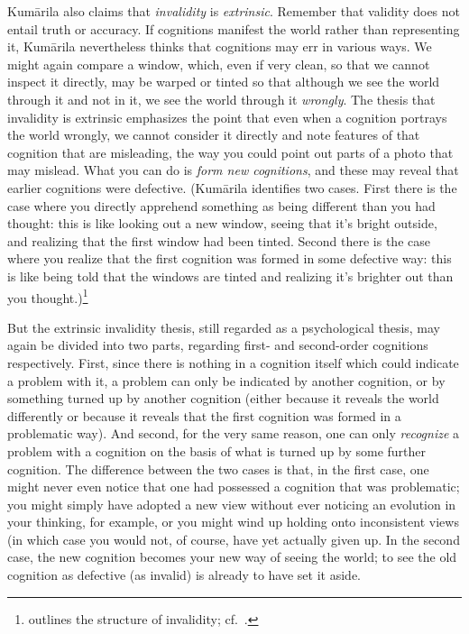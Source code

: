 ﻿\documentclass[11pt]{amsart}
\begin{document}
Kum\=arila also claims that \emph{invalidity} is \emph{extrinsic}. Remember that validity does not entail truth or accuracy. If cognitions manifest the world rather than representing it, Kum\=arila nevertheless thinks that cognitions may err in various ways. We might again compare a window, which, even if very clean, so that we cannot inspect it directly, may be warped or tinted so that although we see the world through it and not in it, we see the world through it \emph{wrongly}. The thesis that invalidity is extrinsic emphasizes the point that even when a cognition portrays the world wrongly, we cannot consider it directly and note features of that cognition that are misleading, the way you could point out parts of a photo that may mislead. What you can do is \emph{form new cognitions}, and these may reveal that earlier cognitions were defective. (Kum\=arila identifies two cases. First there is the case where you directly apprehend something as being different than you had thought: this is like looking out a new window, seeing that it's bright outside,  and realizing that the first window had been tinted. Second there is the case where you realize that the first cognition was formed in some defective way: this is like being told that the windows are tinted and realizing it's brighter out than you thought.)\footnote{\citet{kataoka2002validity} outlines the structure of invalidity; cf.~\citet[p.~132]{bhatt1962epistemology}.}

But the extrinsic invalidity thesis, still regarded as a psychological thesis, may again be divided into two parts, regarding first- and second-order cognitions respectively. First, since there is nothing in a cognition itself which could indicate a problem with it, a problem can only be indicated by another cognition, or by something turned up by another cognition (either because it reveals the world differently or because it reveals that the first cognition was formed in a problematic way). And second, for the very same reason, one can only \emph{recognize} a problem with a cognition on the basis of what is turned up by some further cognition. The difference between the two cases is that, in the first case, one might never even notice that one had possessed a cognition that was problematic; you might simply have adopted a new view without ever noticing an evolution in your thinking, for example, or you might wind up holding onto inconsistent views (in which case you would not, of course, have yet actually given up. In the second case, the new cognition becomes your new way of seeing the world; to see the old cognition as defective (as invalid) is already to have set it aside.
\end{document}
